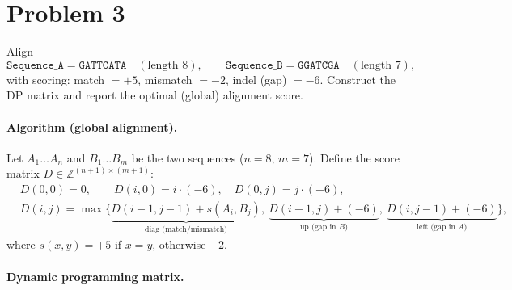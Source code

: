 \section*{Problem 3}
Align
\[
    \texttt{Sequence\_A}=\texttt{GATTCATA}\quad(\text{length }8), \qquad
    \texttt{Sequence\_B}=\texttt{GGATCGA}\quad(\text{length }7),
\]
with scoring: match $=+5$, mismatch $=-2$, indel (gap) $=-6$. Construct the DP matrix and report the optimal (global) alignment score.

\paragraph{Algorithm (global alignment).}
Let $A_1\ldots A_n$ and $B_1\ldots B_m$ be the two sequences ($n=8$, $m=7$).
Define the score matrix $D\in\mathbb{Z}^{(n+1)\times(m+1)}$:
\[
    \begin{aligned}
         & D(0,0)=0,\qquad D(i,0)=i\cdot(-6),\quad D(0,j)=j\cdot(-6), \\
         & D(i,j)=\max\!\Big\{
        \underbrace{D(i\!-\!1,j\!-\!1)+s(A_i,B_j)}_{\text{diag (match/mismatch)}},\
        \underbrace{D(i\!-\!1,j)+(-6)}_{\text{up (gap in $B$)}},\
        \underbrace{D(i,j\!-\!1)+(-6)}_{\text{left (gap in $A$)}}
        \Big\},
    \end{aligned}
\]
where $s(x,y)=+5$ if $x=y$, otherwise $-2$.

\paragraph{Dynamic programming matrix.}\mbox{}\\[0.5ex]


